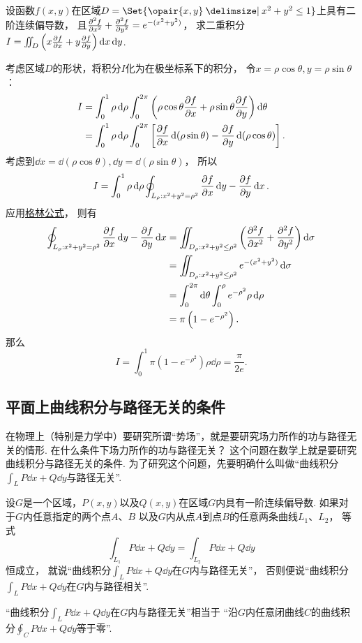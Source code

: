 \begin{example}
设函数\(f(x,y)\)在区域\(D=\Set{\opair{x,y} \given x^2+y^2\leq1}\)上具有二阶连续偏导数，
且\(\pdv[2]{f}{x}+\pdv[2]{f}{y}=e^{-(x^2+y^2)}\)，
求二重积分\(I=\iint_D\left(x\pdv{f}{x}+y\pdv{f}{y}\right)\dd{x}\dd{y}\).
\begin{solution}
考虑区域\(D\)的形状，将积分\(I\)化为在极坐标系下的积分，
令\(x=\rho\cos\theta, y=\rho\sin\theta\)：
\begin{align*}
	I &= \int_0^1 \rho\dd{\rho} \int_0^{2\pi}
		\left(\rho\cos\theta\pdv{f}{x}+\rho\sin\theta\pdv{f}{y}\right) \dd{\theta} \\
	&= \int_0^1 \rho\dd{\rho} \int_0^{2\pi}
		\left[\pdv{f}{x}\dd(\rho\sin\theta)-\pdv{f}{y}\dd(\rho\cos\theta)\right].
\end{align*}
考虑到\(\dd{x}=\dd(\rho\cos\theta),
\dd{y}=\dd(\rho\sin\theta)\)，
所以\[
	I = \int_0^1 \rho\dd{\rho} \oint_{L_{\rho}: x^2+y^2=\rho^2} \pdv{f}{x}\dd{y}-\pdv{f}{y}\dd{x}.
\]
应用\hyperref[equation:线积分与面积分.格林公式]{格林公式}，
则有\begin{align*}
	\oint_{L_{\rho}: x^2+y^2=\rho^2} \pdv{f}{x}\dd{y}-\pdv{f}{y}\dd{x}
	&= \iint_{D_{\rho}: x^2+y^2\leq\rho^2} \left(\pdv[2]{f}{x}+\pdv[2]{f}{y}\right) \dd{\sigma} \\
	&= \iint_{D_{\rho}: x^2+y^2\leq\rho^2} e^{-(x^2+y^2)} \dd{\sigma} \\
	&= \int_0^{2\pi} \dd{\theta} \int_0^{\rho} e^{-\rho^2} \rho\dd{\rho} \\
	&= \pi \left(1-e^{-\rho^2}\right).
\end{align*}
那么\[
	I = \int_0^1 \pi \left(1-e^{-\rho^2}\right) \rho\dd{\rho}
	=  \frac{\pi}{2e}.
\]
\end{solution}
\end{example}

\subsection{平面上曲线积分与路径无关的条件}
在物理上（特别是力学中）要研究所谓“势场”，就是要研究场力所作的功与路径无关的情形.
在什么条件下场力所作的功与路径无关？
这个问题在数学上就是要研究曲线积分与路径无关的条件.
为了研究这个问题，先要明确什么叫做“曲线积分\(\int_L P\dd{x}+Q\dd{y}\)与路径无关”.
\begin{definition}
设\(G\)是一个区域，\(P(x,y)\)以及\(Q(x,y)\)在区域\(G\)内具有一阶连续偏导数.
如果对于\(G\)内任意指定的两个点\(A\)、\(B\)
以及\(G\)内从点\(A\)到点\(B\)的任意两条曲线\(L_1\)、\(L_2\)，
等式\[
	\int_{L_1}{P\dd{x}+Q\dd{y}}
	=\int_{L_2}{P\dd{x}+Q\dd{y}}
\]恒成立，
就说“曲线积分\(\int_L P\dd{x}+Q\dd{y}\)在\(G\)内与路径无关”，
否则便说“曲线积分\(\int_L P\dd{x}+Q\dd{y}\)在\(G\)内与路径相关”.
\end{definition}
“曲线积分\(\int_L P\dd{x}+Q\dd{y}\)在\(G\)内与路径无关”相当于
“沿\(G\)内任意闭曲线\(C\)的曲线积分\(\oint_C P\dd{x}+Q\dd{y}\)等于零”.


